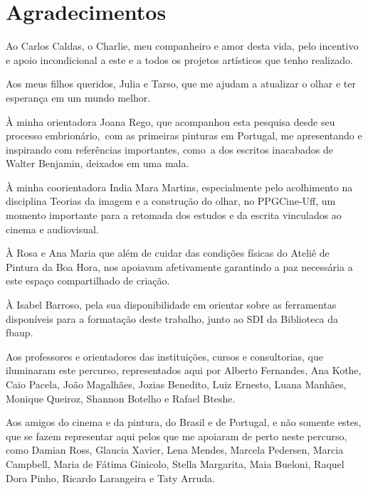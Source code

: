 \cover

\titlepage

\thispagestyle{empty}


\chapter*{Agradecimentos}

\thispagestyle{empty}

Ao Carlos Caldas, o Charlie, meu companheiro e amor desta vida, pelo
incentivo e apoio incondicional a este e a todos os projetos artísticos
que tenho realizado.

Aos meus filhos queridos, Julia e Tarso, que me ajudam a atualizar o
olhar e ter esperança em um mundo melhor.

À minha orientadora Joana Rego, que acompanhou esta pesquisa desde seu
processo embrionário,~com as primeiras pinturas em Portugal, me
apresentando e inspirando com referências importantes, como~a dos
escritos inacabados de Walter Benjamin, deixados em uma mala.

À minha coorientadora India Mara Martins, especialmente pelo acolhimento
na disciplina Teorias da imagem e a construção do olhar, no PPGCine-Uff,
um momento importante para a retomada dos estudos e da escrita
vinculados ao cinema e audiovisual.

À Rosa e Ana Maria que além de cuidar das condições físicas do Ateliê de
Pintura da Boa Hora, nos apoiavam afetivamente garantindo a paz
necessária a este espaço compartilhado de criação.

À Isabel Barroso, pela sua disponibilidade em orientar sobre as
ferramentas disponíveis para a formatação deste trabalho, junto ao SDI
da Biblioteca da \ac{fbaup}.

Aos professores e orientadores das instituições, cursos e consultorias,
que iluminaram este percurso, representados aqui por Alberto Fernandes, Ana Kothe, Caio
Pacela, João Magalhães, Jozias Benedito, Luiz Ernesto, Luana Manhães,
Monique Queiroz, Shannon Botelho e Rafael Bteshe.

Aos amigos do cinema e da pintura, do Brasil e de Portugal, e não
somente estes, que se fazem representar aqui pelos que me apoiaram de
perto neste percurso, como Damian Ross, Glaucia Xavier, Lena Mendes, Marcela Pedersen, Marcia
Campbell, Maria de Fátima Ginicolo, Stella Margarita, Maia Bueloni,
Raquel Dora Pinho, Ricardo Larangeira e Taty Arruda.

\clearpage

